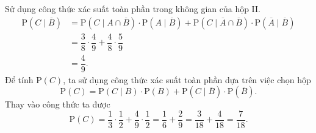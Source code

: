 \begin{ex}
{\begin{itemchoice}
			Sử dụng công thức xác suất toàn phần trong không gian của hộp II.
			\begin{align*}
				\mathrm{P}\left(C \mid \overline{B}\right) &= \mathrm{P}\left(C \mid A \cap \overline{B}\right) \cdot \mathrm{P}\left(A \mid \overline{B}\right) + \mathrm{P}\left(C \mid \overline{A} \cap \overline{B}\right) \cdot \mathrm{P}\left(\overline{A} \mid \overline{B}\right) \\
				&= \dfrac{3}{8} \cdot \dfrac{4}{9} + \dfrac{4}{8} \cdot \dfrac{5}{9} \\
				&= \dfrac{4}{9}.
			\end{align*}
			\itemch Để tính $\mathrm{P}(C)$, ta sử dụng công thức xác suất toàn phần dựa trên việc chọn hộp
			\[ \mathrm{P}(C) = \mathrm{P}\left(C \mid B\right) \cdot \mathrm{P}(B) + \mathrm{P}\left(C \mid \overline{B}\right) \cdot \mathrm{P}\left(\overline{B}\right). \]
			Thay vào công thức ta được
			\[ \mathrm{P}(C) = \dfrac{1}{3} \cdot \dfrac{1}{2} + \dfrac{4}{9} \cdot \dfrac{1}{2} = \dfrac{1}{6} + \dfrac{2}{9} = \dfrac{3}{18} + \dfrac{4}{18} = \dfrac{7}{18}. \]
		\end{itemchoice}
	}
\end{ex}

